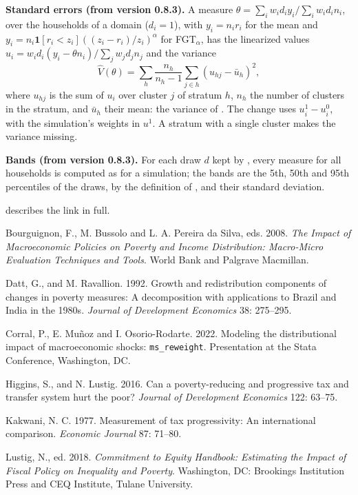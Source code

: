 \textbf{Standard errors (from version 0.8.3).} A measure
$\theta = \sum_i w_i d_i y_i / \sum_i w_i d_i n_i$, over the households of a
domain ($d_i = 1$), with $y_i = n_i r_i$ for the mean and
$y_i = n_i \mathbf{1}[r_i < z_i]((z_i - r_i)/z_i)^\alpha$ for FGT$_\alpha$, has
the linearized values $u_i = w_i d_i (y_i - \theta n_i) / \sum_j w_j d_j n_j$
and the variance
\begin{equation*}
\widehat V(\theta) = \sum_h \frac{n_h}{n_h - 1} \sum_{j \in h} (u_{hj} - \bar u_h)^2,
\end{equation*}
where $u_{hj}$ is the sum of $u_i$ over cluster $j$ of stratum $h$, $n_h$ the
number of clusters in the stratum, and $\bar u_h$ their mean: the variance of
. The change uses $u^1_i - u^0_i$, with the simulation's
weights in $u^1$. A stratum with a single cluster makes the variance
missing.

\textbf{Bands (from version 0.8.3).} For each draw $d$ kept by
, every measure for all households is computed as for
a simulation; the bands are the 5th, 50th and 95th percentiles of the draws,
by the definition of , and their standard deviation.

 describes the link in full.


Bourguignon, F., M. Bussolo and L. A. Pereira da Silva, eds. 2008.
\textit{The Impact of Macroeconomic Policies on Poverty and Income
Distribution: Macro-Micro Evaluation Techniques and Tools}. World Bank and
Palgrave Macmillan.

Datt, G., and M. Ravallion. 1992. Growth and redistribution components of
changes in poverty measures: A decomposition with applications to Brazil and
India in the 1980s. \textit{Journal of Development Economics} 38: 275--295.

Corral, P., E. Mu\~noz and I. Osorio-Rodarte. 2022. Modeling the
distributional impact of macroeconomic shocks: \texttt{ms\_reweight}.
Presentation at the Stata Conference, Washington, DC.

Higgins, S., and N. Lustig. 2016. Can a poverty-reducing and progressive tax
and transfer system hurt the poor? \textit{Journal of Development Economics}
122: 63--75.

Kakwani, N. C. 1977. Measurement of tax progressivity: An international
comparison. \textit{Economic Journal} 87: 71--80.

Lustig, N., ed. 2018. \textit{Commitment to Equity Handbook: Estimating the
Impact of Fiscal Policy on Inequality and Poverty}. Washington, DC: Brookings
Institution Press and CEQ Institute, Tulane University.

